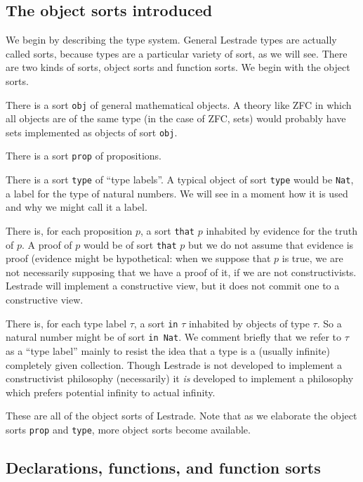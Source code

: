 \documentclass[12pt]{article}
\begin{document}
\subsection{The object sorts introduced}

We begin by describing the type system.  General Lestrade types are actually called sorts, because types are a particular variety of sort, as we will see.  There are two kinds of sorts, object sorts
and function sorts.  We begin with the object sorts.

There is a sort {\tt obj} of general mathematical objects.  A theory like ZFC in which all objects are of the same type (in the case of ZFC, sets) would probably have sets implemented as objects of sort {\tt obj}.

There is a sort {\tt prop} of propositions.

There is a sort {\tt type} of  ``type labels''.  A typical object of sort {\tt type} would be {\tt Nat}, a label for the type of natural numbers.  We will see in a moment how it is used and why we might call it a label.

There is, for each proposition $p$, a sort {\tt that} $p$ inhabited by evidence for the truth of $p$.  A proof of $p$ would be of sort {\tt that} $p$ but we do not assume that evidence is proof (evidence might be hypothetical:  when we suppose that $p$ is true, we are not necessarily supposing that we have a proof of it, if we are not constructivists.  Lestrade will implement a constructive view, but it does not commit one to a constructive view.

There is, for each type label $\tau$, a sort {\tt in} $\tau$ inhabited by objects of type $\tau$.  So a natural number might be of sort {\tt in Nat}. We comment briefly that we refer to $\tau$ as a ``type label'' mainly to resist the idea that a type is a (usually infinite) completely given collection.  Though Lestrade is not developed to implement a constructivist philosophy (necessarily) it {\em is\/} developed to implement a philosophy which prefers potential infinity to actual infinity.

These are all of the object sorts of Lestrade.  Note that as we elaborate the object sorts {\tt prop} and {\tt type}, more object sorts become available.

\subsection{Declarations, functions, and function sorts}
\end{document}
